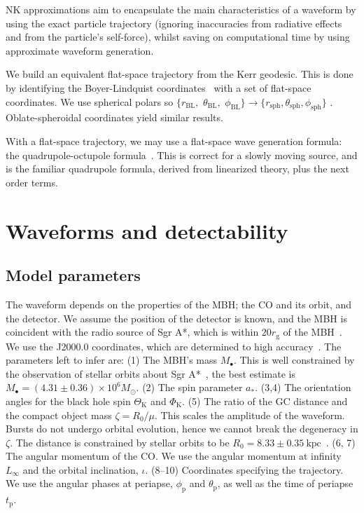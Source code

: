 \documentclass[11pt,twoside]{article}
\begin{document}
NK approximations aim to encapsulate the main characteristics of a waveform by using the exact particle trajectory (ignoring inaccuracies from radiative effects and from the particle's self-force), whilst saving on computational time by using approximate waveform generation.

We build an equivalent flat-space trajectory from the Kerr geodesic. This is done by identifying the Boyer-Lindquist coordinates~\citep{Boyer1967} with a set of flat-space coordinates. We use spherical polars so $\{r_\mathrm{BL},$ $\theta_\mathrm{BL},$ $\phi_\mathrm{BL}\} \rightarrow \{r_\mathrm{sph}, \theta_\mathrm{sph}, \phi_\mathrm{sph}\}$ \citep*{Gair2005}. Oblate-spheroidal coordinates yield similar results.

With a flat-space trajectory, we may use a flat-space wave generation formula: the quadrupole-octupole formula~\citep{Bekenstein1973, Press1977, Yunes2008}. This is correct for a slowly moving source, and is the familiar quadrupole formula, derived from linearized theory, plus the next order terms.  

\section{Waveforms and detectability}\label{sec:Waveforms}

\subsection{Model parameters}

The waveform depends on the properties of the MBH; the CO and its orbit, and the detector. We assume the position of the detector is known, and the MBH is coincident with the radio source of Sgr A*, which is within $20 r_\mathrm{g}$ of the MBH~\citep{Reid2003,Doeleman2008}. We use the J2000.0 coordinates, which are determined to high accuracy~\citep{Reid1999, Yusef-Zadeh1999}. The parameters left to infer are: (1) The MBH's mass $M_\bullet$. This is well constrained by the observation of stellar orbits about Sgr A*~\citep{Ghez2008, Gillessen2009}, the best estimate is $M_\bullet = (4.31 \pm 0.36) \times 10^6 M_\odot$. (2) The spin parameter $a_\ast$. (3,4) The orientation angles for the black hole spin $\Theta_\mathrm{K}$ and $\Phi_\mathrm{K}$. (5) The ratio of the GC distance and the compact object mass $\zeta = R_0/\mu$. This scales the amplitude of the waveform. Bursts do not undergo orbital evolution, hence we cannot break the degeneracy in $\zeta$. The distance is constrained by stellar orbits to be $R_0 = 8.33 \pm 0.35~\mathrm{kpc}$~\citep{Gillessen2009}. (6, 7) The angular momentum of the CO. We use the angular momentum at infinity $L_\infty$ and the orbital inclination, $\iota$. (8--10) Coordinates specifying the trajectory. We use the angular phases at periapse, $\phi_\mathrm{p}$ and $\theta_\mathrm{p}$, as well as the time of periapse $t_\mathrm{p}$.
\end{document}
